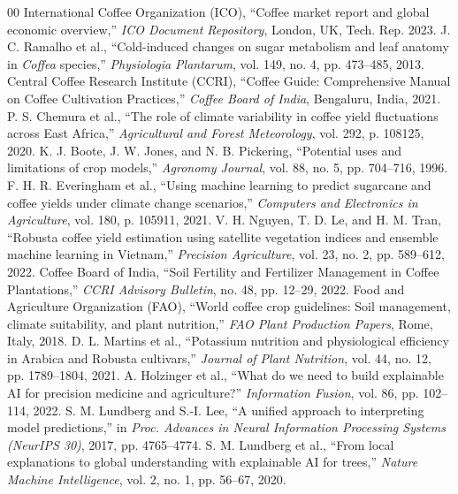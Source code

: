 \documentclass[conference]{IEEEtran}
\begin{document}
\begin{thebibliography}{00}
 International Coffee Organization (ICO), ``Coffee market report and global economic overview,'' \textit{ICO Document Repository}, London, UK, Tech. Rep. 2023.
 J. C. Ramalho et al., ``Cold-induced changes on sugar metabolism and leaf anatomy in \textit{Coffea} species,'' \textit{Physiologia Plantarum}, vol. 149, no. 4, pp. 473--485, 2013.
 Central Coffee Research Institute (CCRI), ``Coffee Guide: Comprehensive Manual on Coffee Cultivation Practices,'' \textit{Coffee Board of India}, Bengaluru, India, 2021.
 P. S. Chemura et al., ``The role of climate variability in coffee yield fluctuations across East Africa,'' \textit{Agricultural and Forest Meteorology}, vol. 292, p. 108125, 2020.
 K. J. Boote, J. W. Jones, and N. B. Pickering, ``Potential uses and limitations of crop models,'' \textit{Agronomy Journal}, vol. 88, no. 5, pp. 704--716, 1996.
 F. H. R. Everingham et al., ``Using machine learning to predict sugarcane and coffee yields under climate change scenarios,'' \textit{Computers and Electronics in Agriculture}, vol. 180, p. 105911, 2021.
 V. H. Nguyen, T. D. Le, and H. M. Tran, ``Robusta coffee yield estimation using satellite vegetation indices and ensemble machine learning in Vietnam,'' \textit{Precision Agriculture}, vol. 23, no. 2, pp. 589--612, 2022.
 Coffee Board of India, ``Soil Fertility and Fertilizer Management in Coffee Plantations,'' \textit{CCRI Advisory Bulletin}, no. 48, pp. 12--29, 2022.
 Food and Agriculture Organization (FAO), ``World coffee crop guidelines: Soil management, climate suitability, and plant nutrition,'' \textit{FAO Plant Production Papers}, Rome, Italy, 2018.
 D. L. Martins et al., ``Potassium nutrition and physiological efficiency in Arabica and Robusta cultivars,'' \textit{Journal of Plant Nutrition}, vol. 44, no. 12, pp. 1789--1804, 2021.
 A. Holzinger et al., ``What do we need to build explainable AI for precision medicine and agriculture?'' \textit{Information Fusion}, vol. 86, pp. 102--114, 2022.
 S. M. Lundberg and S.-I. Lee, ``A unified approach to interpreting model predictions,'' in \textit{Proc. Advances in Neural Information Processing Systems (NeurIPS 30)}, 2017, pp. 4765--4774.
 S. M. Lundberg et al., ``From local explanations to global understanding with explainable AI for trees,'' \textit{Nature Machine Intelligence}, vol. 2, no. 1, pp. 56--67, 2020.

\end{thebibliography}
\end{document}
